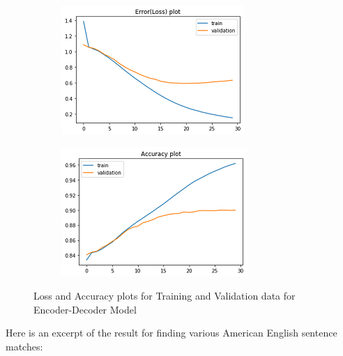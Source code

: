 \documentclass[runningheads]{llncs}
\begin{document}
	\begin{figure}[H]
		\begin{subfigure}[b]{0.49\textwidth}
			\includegraphics[width=\textwidth]{Por-Eng-Train_Loss.png}
			\label{fig:f1}
		\end{subfigure}
		\hfill
		\begin{subfigure}[b]{0.49\textwidth}
			\includegraphics[width=\textwidth]{Por-Eng-Train_Acc.png}
			\label{fig:f2}
		\end{subfigure}
		\caption{Loss and Accuracy plots for Training and Validation data for Encoder-Decoder Model}
	\end{figure}
	\afterpage{\clearpage}

	Here is an excerpt of the result for finding various American English sentence matches:
	
\end{document}
